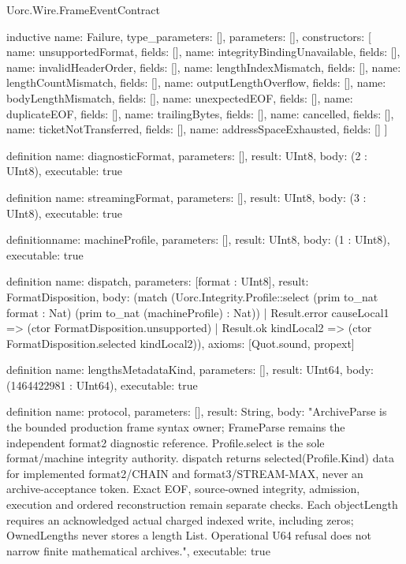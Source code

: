 \begin{lexlean}{Uorc.Wire.FrameEventContract}
\begin{semanticmodule}
inductive{
  name: Failure,
  type_parameters: [],
  parameters: [],
  constructors: [
    {name: unsupportedFormat, fields: []},
    {name: integrityBindingUnavailable, fields: []},
    {name: invalidHeaderOrder, fields: []},
    {name: lengthIndexMismatch, fields: []},
    {name: lengthCountMismatch, fields: []},
    {name: outputLengthOverflow, fields: []},
    {name: bodyLengthMismatch, fields: []},
    {name: unexpectedEOF, fields: []},
    {name: duplicateEOF, fields: []},
    {name: trailingBytes, fields: []},
    {name: cancelled, fields: []},
    {name: ticketNotTransferred, fields: []},
    {name: addressSpaceExhausted, fields: []}
  ]
}

definition{
  name: diagnosticFormat,
  parameters: [],
  result: UInt8,
  body: (2 : UInt8),
  executable: true
}

definition{
  name: streamingFormat,
  parameters: [],
  result: UInt8,
  body: (3 : UInt8),
  executable: true
}

definition{name: machineProfile, parameters: [], result: UInt8, body: (1 : UInt8), executable: true}

definition{
  name: dispatch,
  parameters: [format : UInt8],
  result: FormatDisposition,
  body: (match (Uorc.Integrity.Profile::select (prim to_nat format : Nat) (prim to_nat (machineProfile) : Nat))
    | Result.error causeLocal1 => (ctor FormatDisposition.unsupported)
    | Result.ok kindLocal2 => (ctor FormatDisposition.selected kindLocal2)),
  axioms: [Quot.sound, propext]
}

definition{
  name: lengthsMetadataKind,
  parameters: [],
  result: UInt64,
  body: (1464422981 : UInt64),
  executable: true
}

definition{
  name: protocol,
  parameters: [],
  result: String,
  body: "ArchiveParse is the bounded production frame syntax owner; FrameParse remains the independent format2 diagnostic reference. Profile.select is the sole format/machine integrity authority. dispatch returns selected(Profile.Kind) data for implemented format2/CHAIN and format3/STREAM-MAX, never an archive-acceptance token. Exact EOF, source-owned integrity, admission, execution and ordered reconstruction remain separate checks. Each objectLength requires an acknowledged actual charged indexed write, including zeros; OwnedLengths never stores a length List. Operational U64 refusal does not narrow finite mathematical archives.",
  executable: true
}


\end{semanticmodule}
\end{lexlean}

